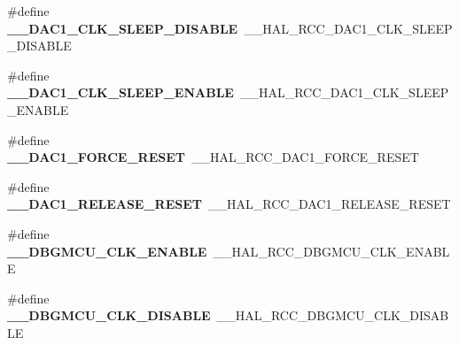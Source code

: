 \begin{DoxyCompactItemize}
\item 
\#define {\bfseries \+\_\+\+\_\+\+D\+A\+C1\+\_\+\+C\+L\+K\+\_\+\+S\+L\+E\+E\+P\+\_\+\+D\+I\+S\+A\+B\+LE}~\+\_\+\+\_\+\+H\+A\+L\+\_\+\+R\+C\+C\+\_\+\+D\+A\+C1\+\_\+\+C\+L\+K\+\_\+\+S\+L\+E\+E\+P\+\_\+\+D\+I\+S\+A\+B\+LE\hypertarget{group___h_a_l___r_c_c___aliased_ga475e99075ae36a0f7018cd5183a3bb17}{}\label{group___h_a_l___r_c_c___aliased_ga475e99075ae36a0f7018cd5183a3bb17}

\item 
\#define {\bfseries \+\_\+\+\_\+\+D\+A\+C1\+\_\+\+C\+L\+K\+\_\+\+S\+L\+E\+E\+P\+\_\+\+E\+N\+A\+B\+LE}~\+\_\+\+\_\+\+H\+A\+L\+\_\+\+R\+C\+C\+\_\+\+D\+A\+C1\+\_\+\+C\+L\+K\+\_\+\+S\+L\+E\+E\+P\+\_\+\+E\+N\+A\+B\+LE\hypertarget{group___h_a_l___r_c_c___aliased_ga26e27afc0dbb8047108c4d858cc1f9c1}{}\label{group___h_a_l___r_c_c___aliased_ga26e27afc0dbb8047108c4d858cc1f9c1}

\item 
\#define {\bfseries \+\_\+\+\_\+\+D\+A\+C1\+\_\+\+F\+O\+R\+C\+E\+\_\+\+R\+E\+S\+ET}~\+\_\+\+\_\+\+H\+A\+L\+\_\+\+R\+C\+C\+\_\+\+D\+A\+C1\+\_\+\+F\+O\+R\+C\+E\+\_\+\+R\+E\+S\+ET\hypertarget{group___h_a_l___r_c_c___aliased_gaf0e724beab212d0055d9186d7790bccd}{}\label{group___h_a_l___r_c_c___aliased_gaf0e724beab212d0055d9186d7790bccd}

\item 
\#define {\bfseries \+\_\+\+\_\+\+D\+A\+C1\+\_\+\+R\+E\+L\+E\+A\+S\+E\+\_\+\+R\+E\+S\+ET}~\+\_\+\+\_\+\+H\+A\+L\+\_\+\+R\+C\+C\+\_\+\+D\+A\+C1\+\_\+\+R\+E\+L\+E\+A\+S\+E\+\_\+\+R\+E\+S\+ET\hypertarget{group___h_a_l___r_c_c___aliased_ga7492fedac23dcce3cf6fcac88c4a5688}{}\label{group___h_a_l___r_c_c___aliased_ga7492fedac23dcce3cf6fcac88c4a5688}

\item 
\#define {\bfseries \+\_\+\+\_\+\+D\+B\+G\+M\+C\+U\+\_\+\+C\+L\+K\+\_\+\+E\+N\+A\+B\+LE}~\+\_\+\+\_\+\+H\+A\+L\+\_\+\+R\+C\+C\+\_\+\+D\+B\+G\+M\+C\+U\+\_\+\+C\+L\+K\+\_\+\+E\+N\+A\+B\+LE\hypertarget{group___h_a_l___r_c_c___aliased_ga22d83d5c92b7c06f58299bf76c0ba1ef}{}\label{group___h_a_l___r_c_c___aliased_ga22d83d5c92b7c06f58299bf76c0ba1ef}

\item 
\#define {\bfseries \+\_\+\+\_\+\+D\+B\+G\+M\+C\+U\+\_\+\+C\+L\+K\+\_\+\+D\+I\+S\+A\+B\+LE}~\+\_\+\+\_\+\+H\+A\+L\+\_\+\+R\+C\+C\+\_\+\+D\+B\+G\+M\+C\+U\+\_\+\+C\+L\+K\+\_\+\+D\+I\+S\+A\+B\+LE\hypertarget{group___h_a_l___r_c_c___aliased_ga2f545f52b81246ca674c70fbd6c4d558}{}\label{group___h_a_l___r_c_c___aliased_ga2f545f52b81246ca674c70fbd6c4d558}


\end{DoxyCompactItemize}
